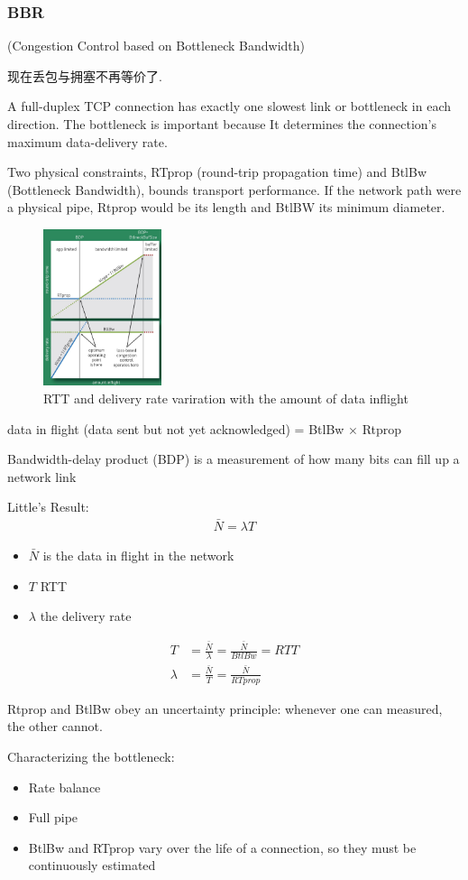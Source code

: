 \subsubsection{BBR} 
(Congestion Control based on Bottleneck Bandwidth)


现在丢包与拥塞不再等价了. 

A full-duplex TCP connection has exactly one slowest link or bottleneck in each direction. The bottleneck is important because It determines the connection's maximum data-delivery rate. 

Two physical constraints, RTprop (round-trip propagation time) and BtlBw (Bottleneck Bandwidth), bounds transport performance. If the network path were a physical pipe, Rtprop would be its length and BtlBW its minimum diameter. 

\begin{figure}[!htb]
    \centering
    \includegraphics[width=0.309\textwidth]{pic/CN6/bbr.png}
    \caption{RTT and delivery rate variration with the amount of data inflight}
\end{figure}

data in flight (data sent but not yet acknowledged) = BtlBw $\times$ Rtprop

Bandwidth-delay product (BDP) is a measurement of how many bits can fill up a network link

Little's Result:
\begin{align*}
    \bar{N}=\lambda T
\end{align*}
\begin{itemize}
    \item $\bar{N}$ is the data in flight in the network
    \item $T$ RTT
    \item $\lambda$ the delivery rate
\end{itemize}

\begin{align*}
    T&=\frac{\bar{N}}{\lambda}=\frac{\bar{N}}{BtlBw}=RTT\\
    \lambda&=\frac{\bar{N}}{T}=\frac{\bar{N}}{RTprop}
\end{align*}

Rtprop and BtlBw obey an uncertainty principle: whenever one can measured, the other cannot.

Characterizing the bottleneck:
\begin{itemize}
    \item Rate balance
    \item Full pipe
    \item BtlBw and RTprop vary over the life of a connection, so they must be continuously estimated
\end{itemize}